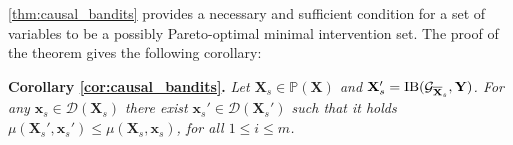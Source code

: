 \autoref{thm:causal_bandits} provides a necessary and sufficient condition for a set of variables to be a possibly Pareto-optimal minimal intervention set. The proof of the theorem gives the following corollary:

\textbf{Corollary \ref{cor:causal_bandits}.}
    \textit{Let $\mathbf{X}_s \in \mathbb{P}(\mathbf{X})$ and $\mathbf{X}_s'=\textnormal{IB}(\mathcal{G}_{\overline{\mathbf{X}}_s}, \mathbf{Y})$. For any $\mathbf{x}_s \in \mathcal{D}(\mathbf{X}_s)$ there exist $\mathbf{x}_s' \in \mathcal{D}(\mathbf{X}_s')$ such that it holds $\mu(\mathbf{X}_s',\mathbf{x}_s') \leq \mu(\mathbf{X}_s,\mathbf{x}_s)$, for all $1\leq i \leq m$.}
